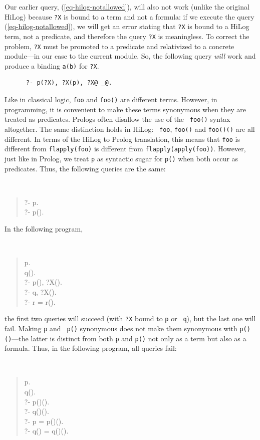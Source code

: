 \documentclass[11pt]{article}
\begin{document}
Our earlier query,
(\ref{eq-hilog-notallowed}), will also not work (unlike the original HiLog)
because {\tt ?X} is bound to a term and not a formula: if we
execute the query (\ref{eq-hilog-notallowed}), we will get an error stating
that {\tt ?X} is bound to a HiLog term, not a predicate, and therefore the
query {\tt ?X} is meaningless.
To correct the problem, {\tt ?X} must be promoted to a predicate
and relativized to a concrete
module---in our case to the current module. So, the following query
\emph{will} work and produce a binding {\tt a(b)} for {\tt ?X}.    
\begin{verbatim}
      ?- p(?X), ?X(p), ?X@ _@.
\end{verbatim}


%
Like in classical logic, {\tt foo} and {\tt foo()} are different terms.
However, in programming, it is convenient to make these terms synonymous
when they
are treated as predicates. Prologs often disallow the use of the {\tt
  foo()} syntax altogether.  The same distinction holds in HiLog: {\tt
  foo}, {\tt foo()} and {\tt foo()()} are all different. In terms of the
HiLog to Prolog translation, this means that {\tt foo} is different from
{\tt flapply(foo)} is different from {\tt flapply(apply(foo))}.  However, just
like in Prolog, we treat {\tt p} as syntactic sugar for {\tt p()} when both
occur as predicates. Thus, the following queries are the same:
{\tt
\begin{quote}
  ?- p.\\
  ?- p().
\end{quote}
}
\noindent
In the following program,
{\tt
\begin{quote}
 p. \\
 q().\\
 ?- p(), ?X().\\
 ?- q, ?X().\\
 ?- r = r().
\end{quote}
}
\noindent
the first two queries will succeed (with {\tt ?X} bound to {\tt p} or {\tt
  q}), but the last one will fail.  Making {\tt p} and {\tt
  p()} synonymous does not make them synonymous with {\tt p()()}---the
latter is distinct from both {\tt p}
and {\tt p()} not only as a term but also as a formula. Thus, in the following
program, all queries fail:
{\tt
\begin{quote}
 p.\\
 q().\\
 ?- p()().\\
 ?- q()().\\
 ?- p = p()().\\
 ?- q() = q()().
\end{quote}
}
\end{document}
